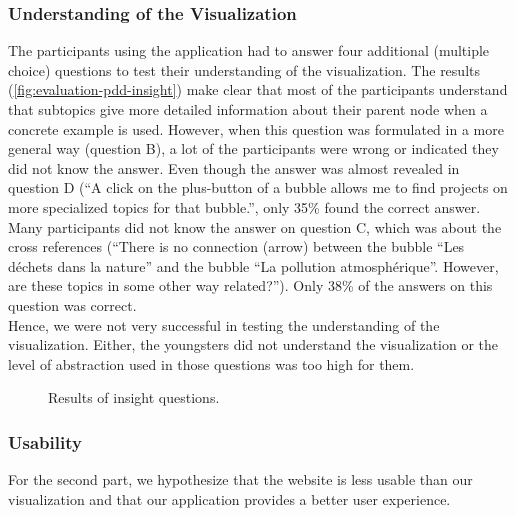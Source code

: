 \subsubsection{Understanding of the Visualization}
The participants using the application had to answer four additional (multiple choice) questions to test their understanding of the visualization. The results (\autoref{fig:evaluation-pdd-insight}) make clear that most of the participants understand that subtopics give more detailed information about their parent node when a concrete example is used. However, when this question was formulated in a more general way (question B), a lot of the participants were wrong or indicated they did not know the answer. Even though the answer was almost revealed in question D (``A click on the plus-button of a bubble allows me to find projects on more specialized topics for that bubble.'', only 35\% found the correct answer.\\

Many participants did not know the answer on question C, which was about the cross references (``There is no connection (arrow) between the bubble ``Les d\'echets dans la nature'' and the bubble ``La pollution atmosph\'erique''. However, are these topics in some other way related?''). Only 38\% of the answers on this question was correct.\\

Hence, we were not very successful in testing the understanding of the visualization. Either, the youngsters did not understand the visualization or the level of abstraction used in those questions was too high for them.

\begin{figure}[H]
	\centering
	\caption{Results of insight questions.}
	\label{fig:evaluation-pdd-insight}
\end{figure}




%	
%	

\subsubsection{Usability}
For the second part, we hypothesize that the website is less usable than our visualization and that our application provides a better user experience.\\

